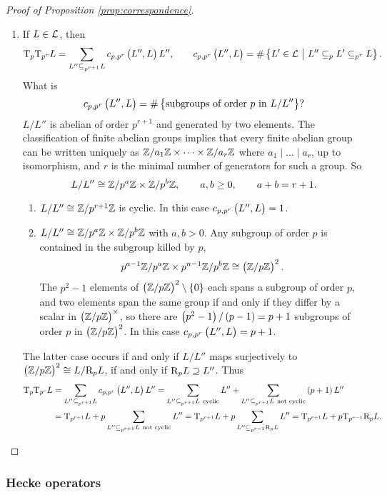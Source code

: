 \begin{proof}[Proof of Proposition \ref{prop:correspondence}]
\begin{enumerate}
\item If $ L \in \mathcal{L} $, then
$$ \T_p\T_{p^r}L = \sum_{L'' \subseteq_{p^{r + 1}} L} c_{p, p^r}\br{L'', L}L'', \qquad c_{p, p^r}\br{L'', L} = \#\cbr{L' \in \LLL \st L'' \subseteq_p L' \subseteq_{p^r} L}. $$
What is
$$ c_{p, p^r}\br{L'', L} = \#\cbr{\text{subgroups of order} \ p \ \text{in} \ L / L''}? $$
$ L / L'' $ is abelian of order $ p^{r + 1} $ and generated by two elements. The classification of finite abelian groups implies that every finite abelian group can be written uniquely as $ \mathbb{Z} / a_1\mathbb{Z} \times \dots \times \mathbb{Z} / a_r\mathbb{Z} $ where $ a_1 \mid \dots \mid a_r $, up to isomorphism, and $ r $ is the minimal number of generators for such a group. So
$$ L / L'' \cong \mathbb{Z} / p^a\mathbb{Z} \times \mathbb{Z} / p^b\mathbb{Z}, \qquad a, b \ge 0, \qquad a + b = r + 1. $$
\begin{enumerate}[label=Case \arabic*., leftmargin=0.5in]
\item $ L / L'' \cong \mathbb{Z} / p^{r + 1}\mathbb{Z} $ is cyclic. In this case $ c_{p, p^r}\br{L'', L} = 1 $.
\item $ L / L'' \cong \mathbb{Z} / p^a\mathbb{Z} \times \mathbb{Z} / p^b\mathbb{Z} $ with $ a, b > 0 $. Any subgroup of order $ p $ is contained in the subgroup killed by $ p $,
$$ p^{a - 1}\ZZ / p^a\ZZ \times p^{n - 1}\ZZ / p^b\ZZ \cong \br{\ZZ / p\ZZ}^2. $$
The $ p^2 - 1 $ elements of $ \br{\ZZ / p\ZZ}^2 \setminus \cbr{0} $ each spans a subgroup of order $ p $, and two elements span the same group if and only if they differ by a scalar in $ \br{\ZZ / p\ZZ}^\times $, so there are $ \br{p^2 - 1} / \br{p - 1} = p + 1 $ subgroups of order $ p $ in $ \br{\ZZ / p\ZZ}^2 $. In this case $ c_{p, p^r}\br{L'', L} = p + 1 $.
\end{enumerate}
The latter case occurs if and only if $ L / L'' $ maps surjectively to $ \br{\ZZ / p\ZZ}^2 \cong L / \R_pL $, if and only if $ \mathrm{R}_pL \supseteq L'' $. Thus
\begin{align*}
\T_p\T_{p^r}L
& = \sum_{L'' \subseteq_{p^{r + 1}} L} c_{p, p^r}\br{L'', L}L''
= \sum_{L'' \subseteq_{p^{r + 1}} L \ \text{cyclic}} L'' + \sum_{L'' \subseteq_{p^{r + 1}} L \ \text{not cyclic}} \br{p + 1}L'' \\
& = \T_{p^{r + 1}}L + p\sum_{L'' \subseteq_{p^{r + 1}} L \ \text{not cyclic}} L''
= \T_{p^{r + 1}}L + p\sum_{L'' \subseteq_{p^{r - 1}} \R_pL} L''
= \T_{p^{r + 1}}L + p\T_{p^{r - 1}}\R_pL.
\end{align*}
\end{enumerate}
\end{proof}

\subsubsection{Hecke operators}

